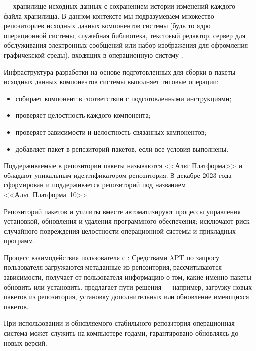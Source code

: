  --- хранилище исходных данных с сохранением истории изменений каждого файла
хранилища. В данном контексте мы подразумеваем множество репозиториев исходных данных компонентов
системы (будь то ядро операционной системы, служебная библиотека, текстовый редактор, сервер для обслуживания
электронных сообщений или набор изображения для офромления графичекской среды), входящих в операционную
систему .

Инфраструктура разработки  на основе подготовленных для сборки в пакеты исходных данных компонентов
системы выполняет типовые операции:
\begin{itemize}
	\item собирает компонент в соответствии с подготовленными инструкциями;
	\item проверяет целостность каждого компонента;
	\item проверяет зависимости и целостность связанных компонентов;
	\item добавляет пакет в репозиторий пакетов, если все условия выполнены.
\end{itemize}

Поддерживаемые в  репозитории пакеты называются <<Альт Платформа>> и обладают уникальным идентификатором
репозитория. В декабре 2023 года сформирован и поддерживается репозиторий  под названием <<Альт~Платформа~10>>.

Репозиторий пакетов и утилиты  вместе автоматизируют процессы управления установкой, обновления и удаления
программного обеспечения; исключают риск случайного повреждения целостности операционной системы и прикладных
программ.

Процесс взаимодействия пользователя с : Средствами APT по запросу пользователя загружаются метаданные
из репозитория, рассчитываются зависимости,  получает от пользователя информацию о том,
какие именно пакеты обновить или установить.  предлагает пути решения --- например, загрузку
новых пакетов из репозитория, установку дополнительных или обновление имеющихся пакетов.


При использовании  и обновляемого стабильного репозитория операционная система может
служить на компьютере годами, гарантировано обновляясь до новых версий.

